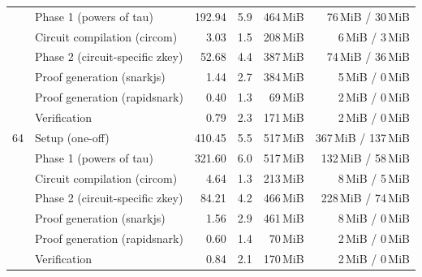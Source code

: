 \begin{table}[t]
{\begin{tabular}{|r|l|r|r|r|r|}
 & \quad Phase 1 (powers of tau) & 192.94 & 5.9 & 464\,MiB & 76\,MiB / 30\,MiB \\
 & \quad Circuit compilation (circom) & 3.03 & 1.5 & 208\,MiB & 6\,MiB / 3\,MiB \\
 & \quad Phase 2 (circuit-specific zkey) & 52.68 & 4.4 & 387\,MiB & 74\,MiB / 36\,MiB \\
 & Proof generation (snarkjs) & 1.44 & 2.7 & 384\,MiB & 5\,MiB / 0\,MiB \\
 & Proof generation (rapidsnark) & 0.40 & 1.3 & 69\,MiB & 2\,MiB / 0\,MiB \\
 & Verification & 0.79 & 2.3 & 171\,MiB & 2\,MiB / 0\,MiB \\
\hline
64 & Setup (one-off) & 410.45 & 5.5 & 517\,MiB & 367\,MiB / 137\,MiB \\
 & \quad Phase 1 (powers of tau) & 321.60 & 6.0 & 517\,MiB & 132\,MiB / 58\,MiB \\
 & \quad Circuit compilation (circom) & 4.64 & 1.3 & 213\,MiB & 8\,MiB / 5\,MiB \\
 & \quad Phase 2 (circuit-specific zkey) & 84.21 & 4.2 & 466\,MiB & 228\,MiB / 74\,MiB \\
 & Proof generation (snarkjs) & 1.56 & 2.9 & 461\,MiB & 8\,MiB / 0\,MiB \\
 & Proof generation (rapidsnark) & 0.60 & 1.4 & 70\,MiB & 2\,MiB / 0\,MiB \\
 & Verification & 0.84 & 2.1 & 170\,MiB & 2\,MiB / 0\,MiB \\
\hline
\end{tabular}}
\end{table}
